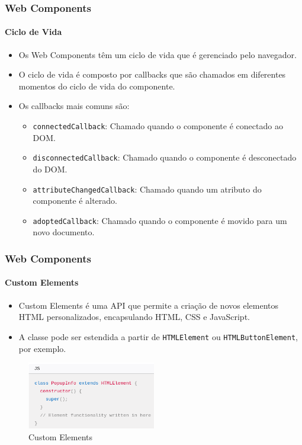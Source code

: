 \documentclass[
	9pt, %
	t, %
]{beamer}
\begin{document}
\begin{frame}
	\frametitle{Web Components}
	\framesubtitle{Ciclo de Vida}
	\begin{itemize}
		\item Os Web Components têm um ciclo de vida que é gerenciado pelo navegador.
		\item O ciclo de vida é composto por callbacks que são chamados em diferentes
		      momentos do ciclo de vida do componente.
		\item Os callbacks mais comuns são:
		      \begin{itemize}
			      \item \texttt{connectedCallback}: Chamado quando o componente é conectado ao DOM.
			      \item \texttt{disconnectedCallback}: Chamado quando o componente é desconectado do DOM.
			      \item \texttt{attributeChangedCallback}: Chamado quando um atributo do componente é alterado.
			      \item \texttt{adoptedCallback}: Chamado quando o componente é movido para um novo documento.
		      \end{itemize}
	\end{itemize}

\end{frame}

\begin{frame}
	\frametitle{Web Components}
	\framesubtitle{Custom Elements}
	\begin{itemize}
		\item Custom Elements é uma API que permite a criação de novos elementos HTML
		      personalizados, encapsulando HTML, CSS e JavaScript.
		\item A classe pode ser estendida a partir de \texttt{HTMLElement} ou
		      \texttt{HTMLButtonElement}, por exemplo.
	\end{itemize}

	\begin{figure}
		\centering
		\includegraphics[width=0.5\textwidth]{custom_elements.png}
		\caption{Custom Elements}
	\end{figure}

\end{frame}
\end{document}
